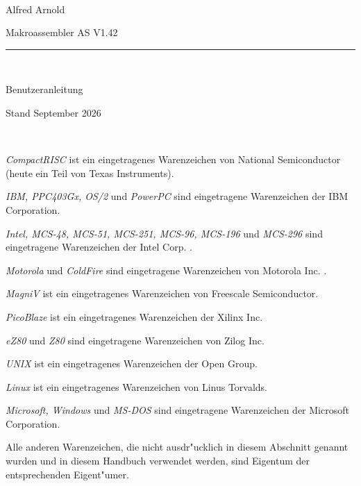 \documentclass[12pt,a4paper,twoside]{report}
\newcommand{\asname}{AS}
\begin{document}
\thispagestyle{empty}

\
\vspace{7cm}\par

\begin{raggedright}
{\large Alfred Arnold}\\
\vspace{1cm}\par
{\huge Makroassembler \asname{} V1.42}\\
\rule{14cm}{0.3mm}\\
\vspace{2mm}\par
{\huge Benutzeranleitung}

\vspace{1cm}\par

{\large Stand September 2026}
\end{raggedright}

\clearpage
\thispagestyle{empty}

\ \vspace{4cm}

{\em CompactRISC} ist ein eingetragenes Warenzeichen von National
 Semiconductor (heute ein Teil von Texas Instruments).

{\em IBM, PPC403Gx, OS/2} und {\em PowerPC} sind eingetragene Warenzeichen
der IBM Corporation.

{\em Intel, MCS-48, MCS-51, MCS-251, MCS-96, MCS-196} und {\em MCS-296}
sind eingetragene Warenzeichen der Intel Corp. .

{\em Motorola} und {\em ColdFire} sind eingetragene Warenzeichen von
Motorola Inc. .

{\em MagniV} ist ein eingetragenes Warenzeichen von Freescale Semiconductor.

{\em PicoBlaze} ist ein eingetragenes Warenzeichen der Xilinx Inc.

{\em eZ80} und {\em Z80} sind eingetragene Warenzeichen von Zilog Inc.

{\em UNIX} ist ein eingetragenes Warenzeichen der Open Group.

{\em Linux} ist ein eingetragenes Warenzeichen von Linus Torvalds.

{\em Microsoft, Windows} und {\em MS-DOS} sind eingetragene Warenzeichen
der Microsoft Corporation.

Alle anderen Warenzeichen, die nicht ausdr"ucklich in diesem Abschnitt
genannt wurden und in diesem Handbuch verwendet werden, sind Eigentum
der entsprechenden Eigent"umer.
\end{document}
